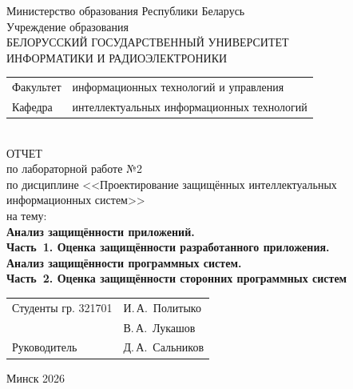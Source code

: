 \begin{titlepage}
	\begin{center}
		Министерство образования Республики Беларусь\\[1em]
		Учреждение образования\\
		БЕЛОРУССКИЙ ГОСУДАРСТВЕННЫЙ УНИВЕРСИТЕТ \\
		ИНФОРМАТИКИ И РАДИОЭЛЕКТРОНИКИ\\[1em]
		
		\begin{minipage}{\textwidth}
			\begin{flushleft}
				\begin{tabular}{ l l }
					Факультет & информационных технологий и управления\\
					Кафедра   & интеллектуальных информационных технологий
				\end{tabular}
			\end{flushleft}
		\end{minipage}\\[1em]
		
		{ОТЧЕТ}\\
		{по лабораторной работе №2}\\
		{по дисциплине <<Проектирование защищённых интеллектуальных}\\
		{информационных систем>>}\\
		{на тему:}\\[1em]
		\textbf{Анализ защищённости приложений.}\\[0.25em]
		\textbf{Часть~1. Оценка защищённости разработанного приложения.}\\[0.4em]
		\textbf{Анализ защищённости программных систем.}\\[0.25em]
		\textbf{Часть~2. Оценка защищённости сторонних программных систем}\\[1em]
		
		\vspace{2em}
		\begin{tabular}{ p{}p{} }
			Студенты гр. 321701 & И.\,А.~Политыко \\
			& В.\,А.~Лукашов \\
			Руководитель & Д.\,А.~Сальников \\
		\end{tabular}
		
		\vfill
		{\normalsize Минск 2026}
	\end{center}
\end{titlepage}
